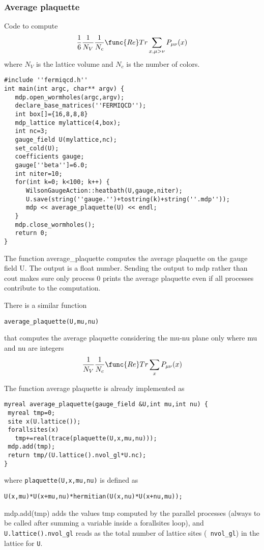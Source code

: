 \subsubsection{Average plaquette}

Code to compute 
\[
\frac 16\frac 1{N_V}\frac 1{N_c}\func{Re}Tr\sum_{x,\mu >\nu }P_{\mu \nu }(x) 
\]
where $N_V$ is the lattice volume and $N_c$ is the number of colors.
\begin{verbatim}
#include ''fermiqcd.h''
int main(int argc, char** argv) {
   mdp.open_wormholes(argc,argv);
   declare_base_matrices(''FERMIQCD'');
   int box[]={16,8,8,8}
   mdp_lattice mylattice(4,box);
   int nc=3;
   gauge_field U(mylattice,nc);
   set_cold(U);
   coefficients gauge;
   gauge[''beta'']=6.0;
   int niter=10;
   for(int k=0; k<100; k++) {
      WilsonGaugeAction::heatbath(U,gauge,niter);
      U.save(string(''gauge.'')+tostring(k)+string(''.mdp''));
      mdp << average_plaquette(U) << endl;
   }
   mdp.close_wormholes();
   return 0;
}
\end{verbatim}

The function average\_plaquette computes the average plaquette on the gauge
field U. The output is a float number. Sending the output to mdp rather than
cout makes sure only process 0 prints the average plaquette even if all
processes contribute to the computation.

There is a similar function
\begin{verbatim}
average_plaquette(U,mu,nu)
\end{verbatim}

that computes the average plaquette considering the mu-nu plane only where
mu and nu are integers 
\[
\frac 1{N_V}\frac 1{N_c}\func{Re}Tr\sum_xP_{\mu \nu }(x) 
\]

The function average plaquette is already implemented as
\begin{verbatim}
myreal average_plaquette(gauge_field &U,int mu,int nu) {
 myreal tmp=0;
 site x(U.lattice());
 forallsites(x)
   tmp+=real(trace(plaquette(U,x,mu,nu)));
 mdp.add(tmp);
 return tmp/(U.lattice().nvol_gl*U.nc);
}
\end{verbatim}

where {\tt plaquette(U,x,mu,nu)} is defined as
\begin{verbatim}
U(x,mu)*U(x+mu,nu)*hermitian(U(x,nu)*U(x+nu,mu));
\end{verbatim}

mdp.add(tmp) adds the values tmp computed by the parallel processes (always
to be called after summing a variable inside a forallsites loop), and {\tt %
U.lattice().nvol\_gl} reads as the total number of lattice sites ({\tt %
nvol\_gl}) in the lattice for {\tt U}.


